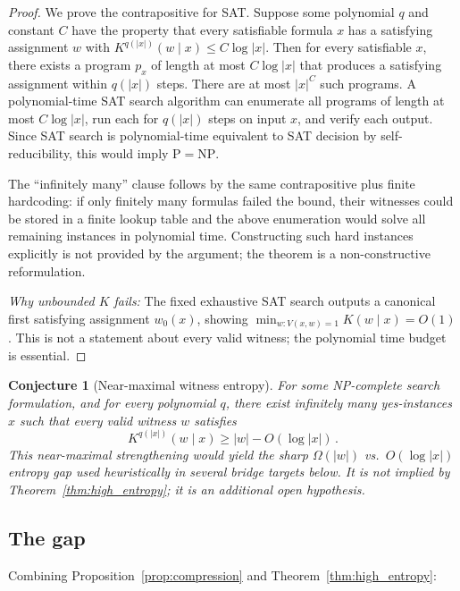 \documentclass[aps,prd,twocolumn,superscriptaddress,nofootinbib]{revtex4-2}
\newtheorem{conjecture}[theorem]{Conjecture}
\theoremstyle{definition}
\theoremstyle{remark}
\newcommand{\NP}{\mathrm{NP}}
\newcommand{\PP}{\mathrm{P}}
\begin{document}
\begin{proof}
We prove the contrapositive for SAT. Suppose some polynomial $q$ and constant $C$ have the property that every satisfiable formula $x$ has a satisfying assignment $w$ with $K^{q(|x|)}(w \mid x) \leq C\log |x|$. Then for every satisfiable $x$, there exists a program $p_x$ of length at most $C\log |x|$ that produces a satisfying assignment within $q(|x|)$ steps. There are at most $|x|^C$ such programs. A polynomial-time SAT search algorithm can enumerate all programs of length at most $C\log |x|$, run each for $q(|x|)$ steps on input $x$, and verify each output. Since SAT search is polynomial-time equivalent to SAT decision by self-reducibility, this would imply $\PP=\NP$.

The ``infinitely many'' clause follows by the same contrapositive plus finite hardcoding: if only finitely many formulas failed the bound, their witnesses could be stored in a finite lookup table and the above enumeration would solve all remaining instances in polynomial time. Constructing such hard instances explicitly is not provided by the argument; the theorem is a non-constructive reformulation.

\textit{Why unbounded $K$ fails:} The fixed exhaustive SAT search outputs
a canonical first satisfying assignment $w_0(x)$, showing
$\min_{w:V(x,w)=1}K(w\mid x)=O(1)$. This is not a statement
about every valid witness; the polynomial time budget is essential.
\end{proof}

\begin{conjecture}[Near-maximal witness entropy]
\label{conj:near-maximal-witness-entropy}
For some NP-complete search formulation, and for every polynomial $q$, there exist infinitely many yes-instances $x$ such that every valid witness $w$ satisfies
\begin{equation}
K^{q(|x|)}(w \mid x) \geq |w| - O(\log |x|)\,.
\end{equation}
This near-maximal strengthening would yield the sharp $\Omega(|w|)$ vs.\ $O(\log |x|)$ entropy gap used heuristically in several bridge targets below. It is not implied by Theorem~\ref{thm:high_entropy}; it is an additional open hypothesis.
\end{conjecture}


\subsection{The gap}

Combining Proposition~\ref{prop:compression} and Theorem~\ref{thm:high_entropy}:
\end{document}
